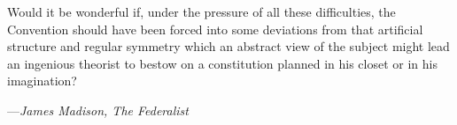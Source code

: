 \null
\vskip 1in

\begingroup
\raggedright
\list{}{\rightmargin=8pc \leftmargin=8pc}\item[] \small
Would it be wonderful if, under the pressure of all these difficulties,
the Convention should have been forced into some deviations from that
artificial structure and regular symmetry which an abstract view of the
subject might lead an ingenious theorist to bestow on a constitution
planned in his closet or in his imagination?
\par\vskip 4pt
\begin{tabbing}
---\={\it James Madison, The Federalist} \\
\end{tabbing}
\endlist
\endgroup

